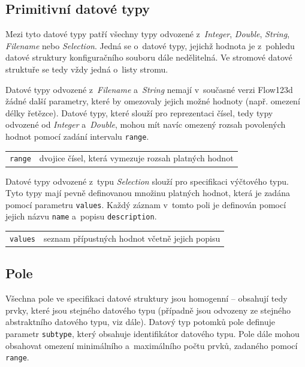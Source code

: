 \documentclass[FM,bw,DP]{tulthesis}
\begin{document}
\subsection{Primitivní datové typy}

Mezi tyto datové typy patří všechny typy odvozené z~\textit{Integer}, \textit{Double}, \textit{String}, \textit{Filename} nebo \textit{Selection}. Jedná se o~datové typy, jejichž hodnota je z~pohledu datové struktury konfiguračního souboru dále nedělitelná. Ve stromové datové struktuře se tedy vždy jedná o~listy stromu.

Datové typy odvozené z~\textit{Filename} a~\textit{String} nemají v~současné verzi Flow123d žádné další parametry, které by omezovaly jejich možné hodnoty (např. omezení délky řetězce). Datové typy, které slouží pro reprezentaci čísel, tedy typy odvozené od \textit{Integer} a~\textit{Double}, mohou mít navíc omezený rozsah povolených hodnot pomocí zadání intervalu \texttt{range}.

\vspace{0.5cm}
\begin{tabular}{m{3cm}@{}l}
\texttt{range}\dotfill & dvojice čísel, která vymezuje rozsah platných hodnot \\
\end{tabular}
\vspace{0.5cm}

Datové typy odvozené z~typu \textit{Selection} slouží pro specifikaci výčtového typu. Tyto typy mají pevně definovanou množinu platných hodnot, která je zadána pomocí parametru \texttt{values}. Každý záznam v~tomto poli je definován pomocí jejich názvu \texttt{name} a~popisu \texttt{description}.


\vspace{0.5cm}
\begin{tabular}{m{3cm}@{}l}
\texttt{values}\dotfill & seznam přípustných hodnot včetně jejich popisu \\
\end{tabular}

\subsection{Pole}

Všechna pole ve specifikaci datové struktury jsou homogenní -- obsahují tedy prvky, které jsou stejného datového typu (případně jsou odvozeny ze stejného abstraktního datového typu, viz dále). Datový typ potomků pole definuje parametr \texttt{subtype}, který obsahuje identifikátor datového typu. Pole dále mohou obsahovat omezení minimálního a~maximálního počtu prvků, zadaného pomocí \texttt{range}.
\end{document}
